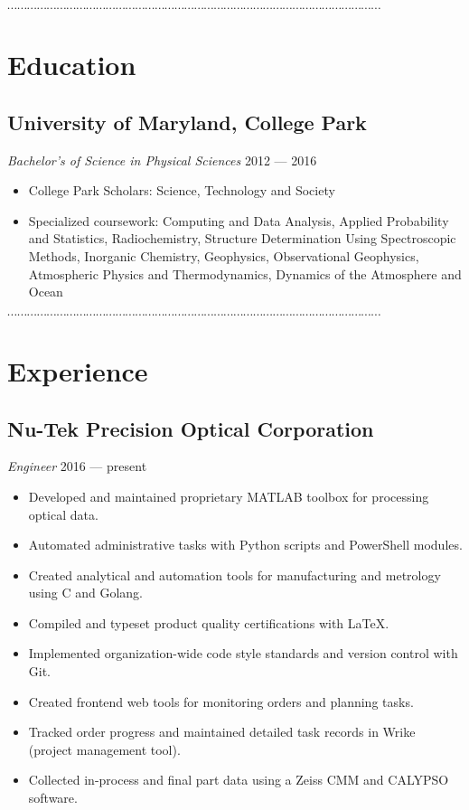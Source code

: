 \documentclass[10pt]{article}
\newcommand{\dotfringe}{
    \begin{center}
      $\cdots\cdots\cdots\cdots\cdots\cdots\cdots\cdots\cdots\cdots\cdots\cdots\cdots\cdots\cdots\cdots\cdots\cdots\cdots\cdots\cdots\cdots\cdots\cdots\cdots\cdots\cdots\cdots\cdots\cdots\cdots\cdots\cdots\cdots\cdots\cdots\cdots\cdots$
    \end{center}
}
\begin{document}

\dotfringe{}

\section*{Education}
\subsection*{University of Maryland, College Park}
\textit{Bachelor's of Science in Physical Sciences} \hfill 2012 --- 2016
\begin{itemize}
  \item College Park Scholars: Science, Technology and Society
  \item Specialized coursework: Computing and Data Analysis, Applied Probability and Statistics, Radiochemistry, Structure Determination Using Spectroscopic Methods, Inorganic Chemistry, Geophysics, Observational Geophysics, Atmospheric Physics and Thermodynamics, Dynamics of the Atmosphere and Ocean
\end{itemize}

\dotfringe{}

\section*{Experience}
\subsection*{Nu-Tek Precision Optical Corporation}
\textit{Engineer} \hfill 2016 --- present
\begin{itemize}
  \item Developed and maintained proprietary MATLAB toolbox for processing optical data.
  \item Automated administrative tasks with Python scripts and PowerShell modules.
  \item Created analytical and automation tools for manufacturing and metrology using C and Golang.
  \item Compiled and typeset product quality certifications with \LaTeX{}.
  \item Implemented organization-wide code style standards and version control with Git.
  \item Created frontend web tools for monitoring orders and planning tasks.
  \item Tracked order progress and maintained detailed task records in Wrike (project management tool).
  \item Collected in-process and final part data using a Zeiss CMM and CALYPSO software.
\end{itemize}
\end{document}
